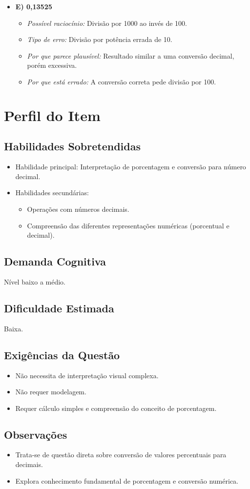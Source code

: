 \documentclass{article}
\begin{document}
\begin{itemize}
  \item \textbf{E) 0,13525}
    \begin{itemize}
      \item \textit{Possível raciocínio:} Divisão por 1000 ao invés de 100.
      \item \textit{Tipo de erro:} Divisão por potência errada de 10.
      \item \textit{Por que parece plausível:} Resultado similar a uma conversão decimal, porém excessiva.
      \item \textit{Por que está errado:} A conversão correta pede divisão por 100.
    \end{itemize}

\end{itemize}

\section{Perfil do Item}

\subsection{Habilidades Sobretendidas}
\begin{itemize}
  \item Habilidade principal: Interpretação de porcentagem e conversão para número decimal.
  \item Habilidades secundárias:
    \begin{itemize}
      \item Operações com números decimais.
      \item Compreensão das diferentes representações numéricas (porcentual e decimal).
    \end{itemize}
\end{itemize}

\subsection{Demanda Cognitiva}
Nível baixo a médio.

\subsection{Dificuldade Estimada}
Baixa.

\subsection{Exigências da Questão}
\begin{itemize}
  \item Não necessita de interpretação visual complexa.
  \item Não requer modelagem.
  \item Requer cálculo simples e compreensão do conceito de porcentagem.
\end{itemize}

\subsection{Observações}
\begin{itemize}
  \item Trata-se de questão direta sobre conversão de valores percentuais para decimais.
  \item Explora conhecimento fundamental de porcentagem e conversão numérica.
\end{itemize}
\end{document}
